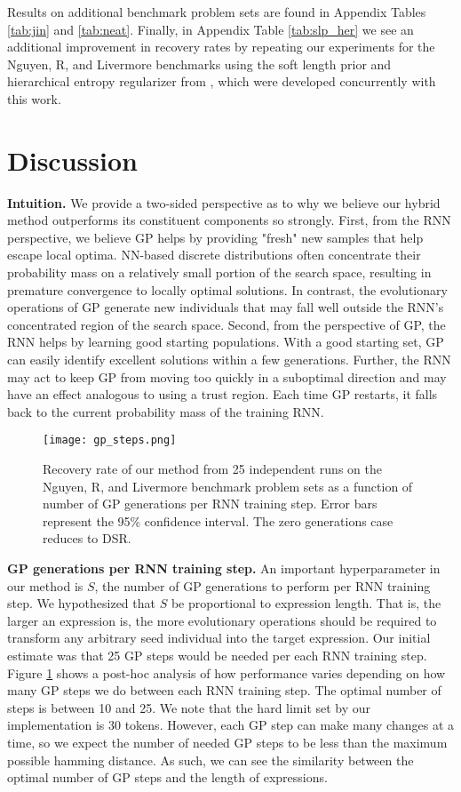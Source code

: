 \documentclass{article}
\newcommand{\alternativeToRL}{RNN training }
\begin{document}
Results on additional benchmark problem sets are found in Appendix Tables \ref{tab:jin} and \ref{tab:neat}.
Finally, in Appendix Table \ref{tab:slp_her} we see an additional improvement in recovery rates by repeating our experiments for the Nguyen, R, and Livermore benchmarks using the soft length prior and hierarchical entropy regularizer from \citet{larma2021improving}, which were developed concurrently with this work.

\section{Discussion}

\textbf{Intuition.}
We provide a two-sided perspective as to why we believe our hybrid method outperforms its constituent components so strongly.
First, from the RNN perspective, we believe GP helps by providing "fresh" new samples that help escape local optima. NN-based discrete distributions often concentrate their probability mass on a relatively small portion of the search space, resulting in premature convergence to locally optimal solutions. In contrast, the evolutionary operations of GP generate new individuals that may fall well outside the RNN's concentrated region of the search space.
Second, from the perspective of GP, the RNN helps by learning good starting populations. With a good starting set, GP can easily identify excellent solutions within a few generations. Further, the RNN may act to keep GP from moving too quickly in a suboptimal direction and may have an effect analogous to using a trust region. Each time GP restarts, it falls back to the current probability mass of the training RNN.  

\begin{figure}
  \centering
  \texttt{[image: gp\_steps.png]}
  \caption{Recovery rate of our method from 25 independent runs on the Nguyen, R, and Livermore benchmark problem sets as a function of number of GP generations per RNN training step.
  Error bars represent the 95\% confidence interval.
  The zero generations case reduces to DSR.}
  \label{fig:gp_steps}
\end{figure}

\textbf{GP generations per RNN training step.}
An important hyperparameter in our method is $S$, the number of GP generations to perform per RNN training step.
We hypothesized that $S$ be proportional to expression length.
That is, the larger an expression is, the more evolutionary operations should be required to transform any arbitrary seed individual into the target expression.
Our initial estimate was that 25 GP steps would be needed per each \alternativeToRL  step.
Figure \ref{fig:gp_steps} shows a post-hoc analysis of how performance varies depending on how many GP steps we do between each \alternativeToRL  step.
The optimal number of steps is between 10 and 25.
We note that the hard limit set by our implementation is 30 tokens.
However, each GP step can make many changes at a time, so we expect the number of needed GP steps to be less than the maximum possible hamming distance.
As such, we can see the similarity between the optimal number of GP steps and the length of expressions.
\end{document}
